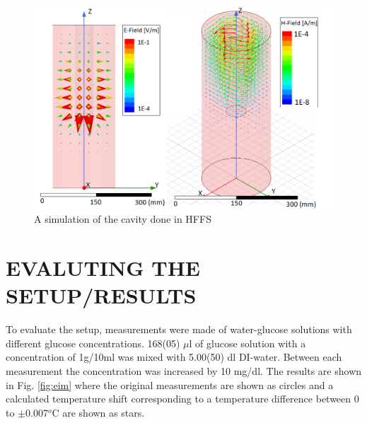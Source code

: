 \documentclass[10pt,final,conference,a4paper,twocolumn]{IEEEtran_AntennEMB_GigaHertz2016}
\begin{document}
\begin{figure}[b]
 	\centering
 	\includegraphics[width=1.0\columnwidth]{EHfield.png}
 	\caption{A simulation of the cavity done in HFFS}
 	\label{fig:sim}
 \end{figure}
\section{EVALUTING THE SETUP/RESULTS}
To evaluate the setup, measurements were made of water-glucose solutions with different glucose concentrations. 168(05) $\mu$l of glucose solution with a concentration of 1g/10ml was mixed with 5.00(50) dl DI-water. Between each measurement the concentration was increased by 10 mg/dl. The results are shown in Fig. \ref{fig:eim} where the original measurements are shown as circles and a calculated temperature shift corresponding to a temperature difference between 0 to $\pm$0.007$^o$C are shown as stars.
\end{document}
